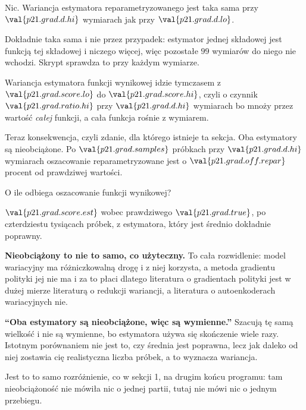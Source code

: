 \begin{fr}
\begin{ansblock}
Nic. Wariancja estymatora reparametryzowanego jest taka sama przy
$\val{p21.grad.d.hi}$ wymiarach jak przy $\val{p21.grad.d.lo}$.
\end{ansblock}

Dokładnie taka sama i nie przez przypadek: estymator jednej składowej jest
funkcją tej składowej i niczego więcej, więc pozostałe $99$ wymiarów do niego
nie wchodzi. Skrypt sprawdza to przy każdym wymiarze.

Wariancja estymatora funkcji wynikowej idzie tymczasem z
$\val{p21.grad.score.lo}$ do $\val{p21.grad.score.hi}$, czyli o czynnik
$\val{p21.grad.ratio.hi}$ przy $\val{p21.grad.d.hi}$ wymiarach \dash{} bo mnoży
przez wartość \emph{całej} funkcji, a cała funkcja rośnie z wymiarem.
\end{fr}

\begin{fr}
Teraz konsekwencja, czyli zdanie, dla którego istnieje ta sekcja. Oba
estymatory są nieobciążone. Po $\val{p21.grad.samples}$ próbkach przy
$\val{p21.grad.d.hi}$ wymiarach oszacowanie reparametryzowane jest o
$\val{p21.grad.off.repar}$ procent od prawdziwej wartości.

O ile odbiega oszacowanie funkcji wynikowej?
\nextframe
\end{fr}

\begin{fr}
$\val{p21.grad.score.est}$ wobec prawdziwego $\val{p21.grad.true}$, po
czterdziestu tysiącach próbek, z estymatora, który jest średnio dokładnie
poprawny.

\textbf{Nieobciążony to nie to samo, co użyteczny.} To cała rozwidlenie: model
wariacyjny ma różniczkowalną drogę i z niej korzysta, a metoda gradientu
polityki jej nie ma i za to płaci \dash{} dlatego literatura o gradientach
polityki jest w dużej mierze literaturą o redukcji wariancji, a literatura o
autoenkoderach wariacyjnych nie.
\end{fr}

\begin{fr}
\begin{trapbox}
\textbf{\enquote{Oba estymatory są nieobciążone, więc są wymienne.}} Szacują tę
samą wielkość i nie są wymienne, bo estymatora używa się skończenie wiele razy.
Istotnym porównaniem nie jest to, czy średnia jest poprawna, lecz jak daleko od
niej zostawia cię realistyczna liczba próbek, a to wyznacza wariancja.

Jest to to samo rozróżnienie, co w sekcji 1, na drugim końcu programu: tam
nieobciążoność nie mówiła nic o jednej partii, tutaj nie mówi nic o jednym
przebiegu.
\end{trapbox}
\end{fr}

